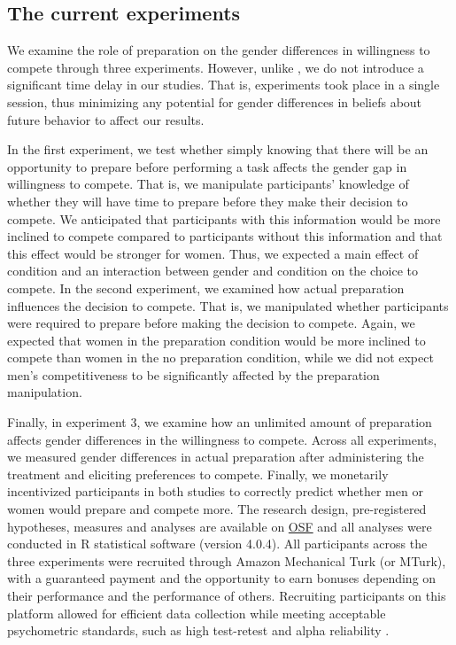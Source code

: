 \documentclass[a4paper, nobind]{templates/ociamthesis}
\begin{document}
\hypertarget{the-current-experiments}{%
\subsection{The current experiments}\label{the-current-experiments}}

We examine the role of preparation on the gender differences in willingness to compete through three experiments. However, unlike \textcite{Charness2021}, we do not introduce a significant time delay in our studies. That is, experiments took place in a single session, thus minimizing any potential for gender differences in beliefs about future behavior to affect our results.

In the first experiment, we test whether simply knowing that there will be an opportunity to prepare before performing a task affects the gender gap in willingness to compete. That is, we manipulate participants' knowledge of whether they will have time to prepare before they make their decision to compete. We anticipated that participants with this information would be more inclined to compete compared to participants without this information and that this effect would be stronger for women. Thus, we expected a main effect of condition and an interaction between gender and condition on the choice to compete. In the second experiment, we examined how actual preparation influences the decision to compete. That is, we manipulated whether participants were required to prepare before making the decision to compete. Again, we expected that women in the preparation condition would be more inclined to compete than women in the no preparation condition, while we did not expect men's competitiveness to be significantly affected by the preparation manipulation.

Finally, in experiment 3, we examine how an unlimited amount of preparation affects gender differences in the willingness to compete. Across all experiments, we measured gender differences in actual preparation after administering the treatment and eliciting preferences to compete. Finally, we monetarily incentivized participants in both studies to correctly predict whether men or women would prepare and compete more. The research design, pre-registered hypotheses, measures and analyses are available on \href{https://osf.io/q39a5/}{OSF} and all analyses were conducted in R statistical software (version 4.0.4). All participants across the three experiments were recruited through Amazon Mechanical Turk (or MTurk), with a guaranteed payment and the opportunity to earn bonuses depending on their performance and the performance of others. Recruiting participants on this platform allowed for efficient data collection while meeting acceptable psychometric standards, such as high test-retest and alpha reliability \autocite{Rand2012,Buhrmester2011,Paolacci2014,Chandler2016}.
\end{document}
